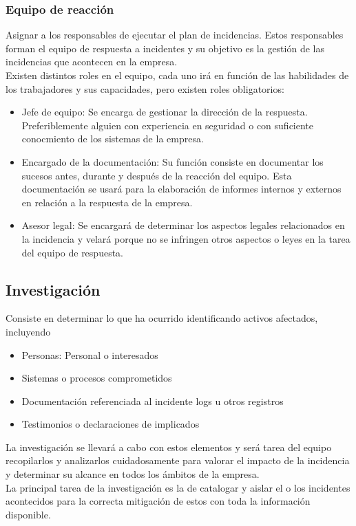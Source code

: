 \documentclass[10pt,a4paper]{article}
\begin{document}
\begin{enumerate}
\subsubsection{Equipo de reacción}
Asignar a los responsables de ejecutar el plan de incidencias. Estos responsables forman el equipo de respuesta a incidentes y su objetivo es la gestión de las incidencias que acontecen en la empresa.\\
Existen distintos roles en el equipo, cada uno irá en función de las habilidades de los trabajadores y sus capacidades, pero existen roles obligatorios:
\begin{itemize}
\item Jefe de equipo: Se encarga de gestionar la dirección de la respuesta. Preferiblemente alguien con experiencia en seguridad o con suficiente conocmiento de los sistemas de la empresa.
\item Encargado de la documentación: Su función consiste en documentar los sucesos antes, durante y después de la reacción del equipo. Esta documentación se usará para la elaboración de informes internos y externos en relación a la respuesta de la empresa.
\item Asesor legal: Se encargará de determinar los aspectos legales relacionados en la incidencia y velará porque no se infringen otros aspectos o leyes en la tarea del equipo de respuesta.
\end{itemize}
\subsection{Investigación}
Consiste en determinar lo que ha ocurrido identificando activos afectados, incluyendo
\begin{itemize}
\item Personas: Personal o interesados
\item Sistemas o procesos comprometidos
\item Documentación referenciada al incidente logs u otros registros
\item Testimonios o declaraciones de implicados
\end{itemize}
La investigación se llevará a cabo con estos elementos y será tarea del equipo recopilarlos y analizarlos cuidadosamente para valorar el impacto de la incidencia y determinar su alcance en todos los ámbitos de la empresa.\\
La principal tarea de la investigación es la de catalogar y aislar el o los incidentes acontecidos para la correcta mitigación de estos con toda la información disponible.

\end{enumerate}
\end{document}
